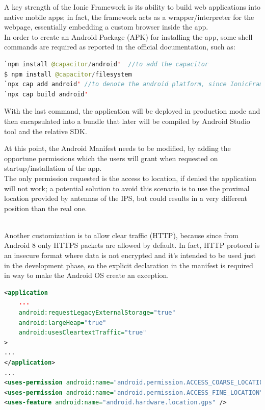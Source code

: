 \documentclass[conference]{IEEEtran}
\begin{document}
A key strength of the Ionic Framework is its ability to build web applications into native mobile apps; in fact, the framework acts as a wrapper/interpreter for the webpage, essentially embedding a custom browser inside the app.
\\
In order to create an Android Package (APK) for installing the app, some shell commands are required as reported in the official documentation, such as:
\begin{lstlisting}[language=Java]
`npm install @capacitor/android'  //to add the capacitor
$ npm install @capacitor/filesystem
`npx cap add android' //to denote the android platform, since IonicFramework can also build for "iOS" operating system
`npx cap build android' 
\end{lstlisting}
With the last command, the application will be deployed in production mode and then encapsulated into a bundle that later will be compiled by Android Studio \cite{b11} tool and the relative SDK.



At this point, the Android Manifest needs to be modified, by adding the opportune permissions which the users will grant when requested on startup/installation of the app.
\\
The only permission requested is the access to location, if denied the application will not work; a potential solution to avoid this scenario is to use the proximal location provided by antennas of the IPS, but could results in a very different position than the real one.

\\
Another customization is to allow clear traffic (HTTP), because since from Android 8 only HTTPS packets are allowed by default.
In fact, HTTP protocol is an insecure format where data is not encrypted and it's intended to be used just in the development phase, so the explicit declaration in the manifest is required in way to make the Android OS create an exception.

\begin{lstlisting}[language=XML, caption=Snippet of Android Manifest]
<application
    ...
    android:requestLegacyExternalStorage="true"
    android:largeHeap="true"
    android:usesCleartextTraffic="true"
>
...
</application>
...
<uses-permission android:name="android.permission.ACCESS_COARSE_LOCATION" />
<uses-permission android:name="android.permission.ACCESS_FINE_LOCATION" />
<uses-feature android:name="android.hardware.location.gps" />
        
\end{lstlisting}
\end{document}

